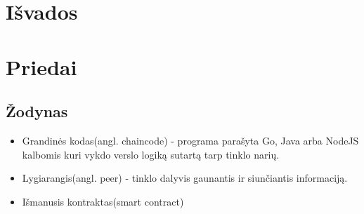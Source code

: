 \documentclass{VUMIFPSkursinis}
\begin{document}
\section{Išvados}

\section{Priedai}
\subsection{Žodynas}
\begin{itemize}
	\item{Grandinės kodas(angl. chaincode) - programa parašyta Go, Java arba NodeJS kalbomis kuri vykdo
 verslo logiką sutartą tarp tinklo narių.}
	\item{Lygiarangis(angl. peer) - tinklo dalyvis gaunantis ir siunčiantis informaciją.}
	\item{Išmanusis kontraktas(smart contract)}
\end{itemize}


\printbibliography[heading=bibintoc]  
\end{document}

